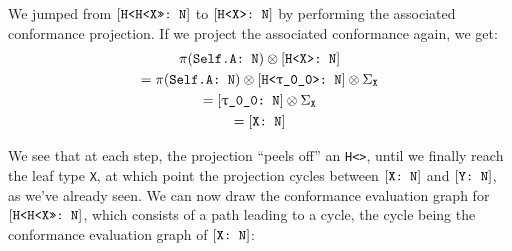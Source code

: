 \documentclass[../generics]{subfiles}
\begin{document}
We jumped from $[\texttt{H<H<X>>:~N}]$ to $[\texttt{H<X>:~N}]$ by performing the associated conformance projection. If we project the associated conformance again, we get:
\begin{gather*}
\SelfAToN \otimes \ConfReq{H<X>}{N}\\
= \SelfAToN \otimes \ConfReq{H<\ttgp{0}{0}>}{N} \otimes \Sigma_{\texttt{X}}\\
= \ConfReq{\ttgp{0}{0}}{N} \otimes \Sigma_{\texttt{X}}\\
= \ConfReq{X}{N}
\end{gather*}

We see that at each step, the projection ``peels off'' an \texttt{H<>}, until we finally reach the leaf type \verb|X|, at which point the projection cycles between $[\texttt{X:~N}]$ and $[\texttt{Y:~N}]$, as we've already seen. We can now draw the conformance evaluation graph for $[\texttt{H<H<X>>:~N}]$, which consists of a path leading to a cycle, the cycle being the conformance evaluation graph of $[\texttt{X:~N}]$:
\begin{quote}
\end{quote}
\end{document}
